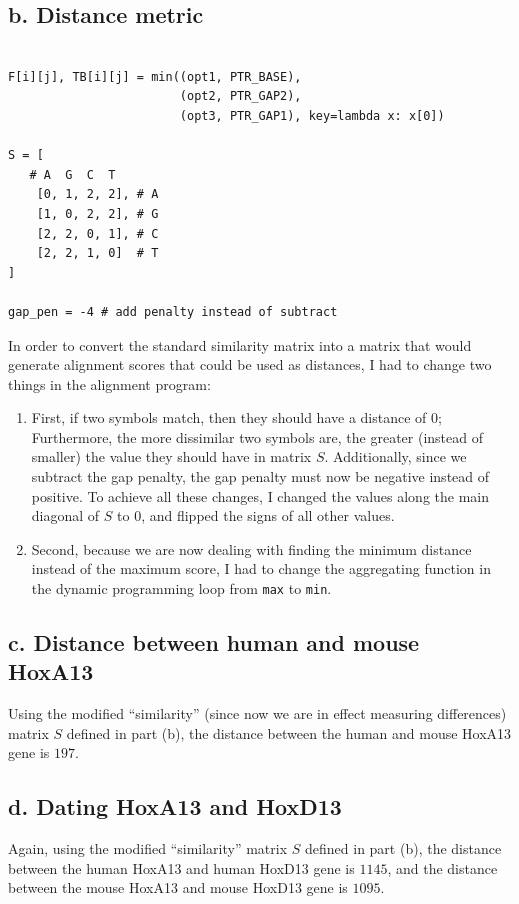 \documentclass[a4paper]{article}
\begin{document}
\subsection*{b. Distance metric}
\begin{verbatim}

F[i][j], TB[i][j] = min((opt1, PTR_BASE),
                        (opt2, PTR_GAP2),
                        (opt3, PTR_GAP1), key=lambda x: x[0])

S = [
   # A  G  C  T
    [0, 1, 2, 2], # A
    [1, 0, 2, 2], # G
    [2, 2, 0, 1], # C
    [2, 2, 1, 0]  # T
]

gap_pen = -4 # add penalty instead of subtract
\end{verbatim}

In order to convert the standard similarity matrix into a matrix
that would generate alignment scores that could be used as distances,
I had to change two things in the alignment program:
\begin{enumerate}
\item First, if two symbols match, then they should have a distance of 0;
Furthermore, the more dissimilar two symbols are, the greater (instead
of smaller) the value they should have in matrix $S$. Additionally, since
we subtract the gap penalty, the gap penalty must now be negative
instead of positive. To achieve all these changes, I changed the values
along the main diagonal of $S$ to $0$, and flipped the signs of all
other values.
\item Second, because we are now dealing with finding the minimum distance
instead of the maximum score, I had to change the aggregating function
in the dynamic programming loop from {\tt max} to {\tt min}.
\end{enumerate}

\subsection*{c. Distance between human and mouse HoxA13}
Using the modified ``similarity'' (since now we are in effect
measuring differences) matrix $S$ defined in part (b), the
distance between the human and mouse HoxA13 gene is $197$.

\subsection*{d. Dating HoxA13 and HoxD13}
Again, using the modified ``similarity'' matrix $S$ defined in part (b),
the distance between the human HoxA13 and human HoxD13 gene is $1145$,
and the distance between the mouse HoxA13 and mouse HoxD13 gene is $1095$.
\end{document}

